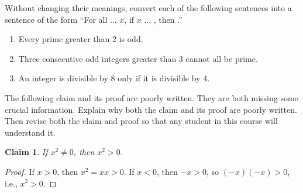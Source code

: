 \documentclass{article}
\newtheorem*{claim}{Claim}
\theoremstyle{definition}
\begin{document}
\begin{question}{6}
   Without changing their meanings, convert each of the following sentences into a sentence of the form ``For all ... $x$, if $x$ ... , then .''
    \begin{enumerate}
        \item Every prime greater than 2 is odd.
        \item Three consecutive odd integers greater than 3 cannot all be prime.
        \item An integer is divisible by 8 only if it is divisible by 4.
    \end{enumerate}
\end{question}
\begin{solution}
\end{solution}


\begin{question}{10}
   The following claim and its proof are poorly written. They are both missing some crucial information. 
   Explain why both the claim and its proof are poorly written. Then revise both the claim and proof so that any student in this course will understand it. 
      \begin{claim}
       If $x^2\neq 0$, then $x^2>0$.
      \end{claim}
      \begin{proof}
       If $x>0$, then $x^2=xx>0$. If $x<0$, then $-x>0$, so $(-x)(-x)>0$, i.e., $x^2>0$.
      \end{proof}
\end{question}
\begin{solution}
\end{solution}
\end{document}
